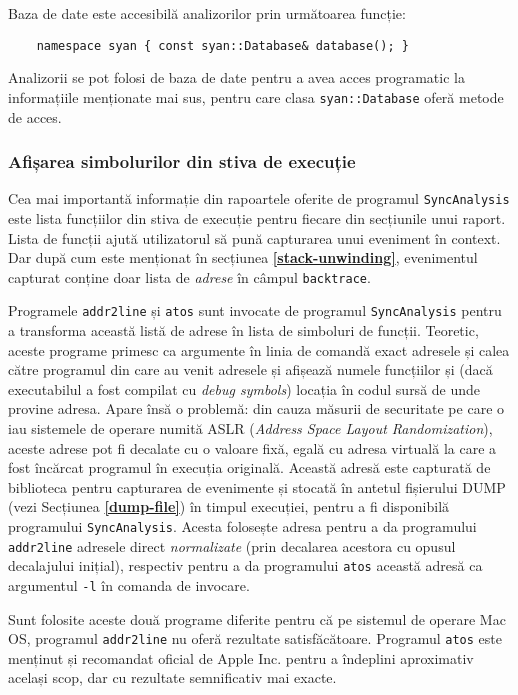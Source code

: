 Baza de date este accesibilă analizorilor prin următoarea funcție:
\begin{lstlisting}
    namespace syan { const syan::Database& database(); }
\end{lstlisting}
Analizorii se pot folosi de baza de date pentru a avea acces programatic
la informațiile menționate mai sus, pentru care clasa
\lstinline{syan::Database} oferă metode de acces.

\subsubsection{Afișarea simbolurilor din stiva de execuție}
\label{stack-reconstruction}

Cea mai importantă informație din rapoartele oferite de programul
\lstinline{SyncAnalysis} este lista funcțiilor din stiva de execuție
pentru fiecare din secțiunile unui raport. Lista de funcții ajută
utilizatorul să pună capturarea unui eveniment în context. Dar după
cum este menționat în secțiunea \textbf{\ref{stack-unwinding}},
evenimentul capturat conține doar lista de \textit{adrese} în câmpul
\lstinline{backtrace}.

Programele \lstinline{addr2line}\cite{binutils} și
\lstinline{atos}\cite{atos} sunt invocate de programul
\lstinline{SyncAnalysis} pentru a transforma această listă de adrese în
lista de simboluri de funcții. Teoretic, aceste programe primesc ca
argumente în linia de comandă exact adresele și calea către programul
din care au venit adresele și afișează numele funcțiilor și (dacă
executabilul a fost compilat cu \textit{debug symbols}) locația în codul
sursă de unde provine adresa. Apare însă o problemă: din cauza măsurii
de securitate pe care o iau sistemele de operare numită ASLR
(\textit{Address Space Layout Randomization}\cite{ASLR}), aceste adrese
pot fi decalate cu o valoare fixă, egală cu adresa virtuală la care a
fost încărcat programul în execuția originală. Această adresă este
capturată de biblioteca pentru capturarea de evenimente și stocată în
antetul fișierului DUMP (vezi Secțiunea \textbf{\ref{dump-file}}) în
timpul execuției, pentru a fi disponibilă programului
\lstinline{SyncAnalysis}. Acesta folosește adresa pentru a da
programului \lstinline{addr2line} adresele direct \textit{normalizate}
(prin decalarea acestora cu opusul decalajului inițial), respectiv
pentru a da programului \lstinline{atos} această adresă ca argumentul
\lstinline{-l} în comanda de invocare.

Sunt folosite aceste două programe diferite pentru că pe sistemul de
operare Mac OS, programul \lstinline{addr2line} nu oferă rezultate
satisfăcătoare. Programul \lstinline{atos} este menținut și recomandat
oficial de Apple Inc. pentru a îndeplini aproximativ același scop, dar
cu rezultate semnificativ mai exacte.

